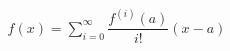 \documentclass[preview]{standalone}
\begin{document}
\begin{align*}
f(x) = \sum_{i=0}^{\infty}\dfrac{f^{(i)}(a)}{i!}(x-a)
\end{align*}
\end{document}
